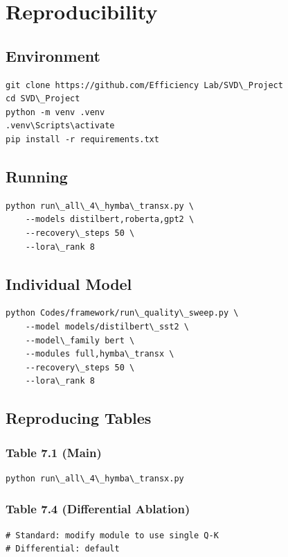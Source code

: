\section{Reproducibility}

\subsection{Environment}

\begin{lstlisting}
git clone https://github.com/Efficiency Lab/SVD\_Project
cd SVD\_Project
python -m venv .venv
.venv\Scripts\activate
pip install -r requirements.txt
\end{lstlisting}

\subsection{Running}

\begin{lstlisting}
python run\_all\_4\_hymba\_transx.py \
    --models distilbert,roberta,gpt2 \
    --recovery\_steps 50 \
    --lora\_rank 8
\end{lstlisting}

\subsection{Individual Model}

\begin{lstlisting}
python Codes/framework/run\_quality\_sweep.py \
    --model models/distilbert\_sst2 \
    --model\_family bert \
    --modules full,hymba\_transx \
    --recovery\_steps 50 \
    --lora\_rank 8
\end{lstlisting}

\subsection{Reproducing Tables}

\subsubsection{Table 7.1 (Main)}
\begin{lstlisting}
python run\_all\_4\_hymba\_transx.py
\end{lstlisting}

\subsubsection{Table 7.4 (Differential Ablation)}
\begin{lstlisting}
# Standard: modify module to use single Q-K
# Differential: default
\end{lstlisting}

